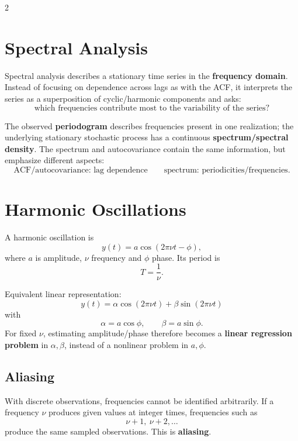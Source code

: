 \documentclass[9pt,a4paper]{extarticle}
\newcommand{\key}[1]{\textbf{#1}}
\begin{document}
\begin{multicols}{2}
\raggedcolumns

\section{Spectral Analysis}

Spectral analysis describes a stationary time series in the \key{frequency domain}. Instead of focusing on dependence across lags as with the ACF, it interprets the series as a superposition of cyclic/harmonic components and asks:
\[
\boxed{\text{which frequencies contribute most to the variability of the series?}}
\]

The observed \key{periodogram} describes frequencies present in one realization; the underlying stationary stochastic process has a continuous \key{spectrum/spectral density}. The spectrum and autocovariance contain the same information, but emphasize different aspects:
\[
\boxed{\text{ACF/autocovariance: lag dependence}\qquad
\text{spectrum: periodicities/frequencies}.}
\]

\section{Harmonic Oscillations}

A harmonic oscillation is
\[
\boxed{y(t)=a\cos(2\pi\nu t-\phi)},
\]
where \(a\) is amplitude, \(\nu\) frequency and \(\phi\) phase. Its period is
\[
\boxed{T=\frac1\nu}.
\]

Equivalent linear representation:
\[
\boxed{
y(t)=\alpha\cos(2\pi\nu t)+
\beta\sin(2\pi\nu t)
}
\]
with
\[
\alpha=a\cos\phi,\qquad
\beta=a\sin\phi.
\]
For fixed \(\nu\), estimating amplitude/phase therefore becomes a \key{linear regression problem} in \(\alpha,\beta\), instead of a nonlinear problem in \(a,\phi\).

\subsection{Aliasing}

With discrete observations, frequencies cannot be identified arbitrarily. If a frequency \(\nu\) produces given values at integer times, frequencies such as
\[
\nu+1,\ \nu+2,\ldots
\]
produce the same sampled observations. This is \key{aliasing}.


\end{multicols}
\end{document}
